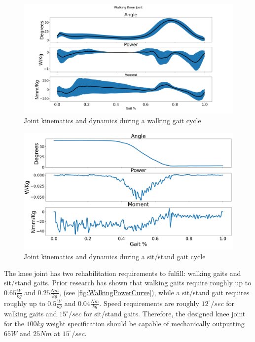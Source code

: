 \begin{figure}[ht!]
    \centering
    \includegraphics[width=\linewidth]{Figures/Design/WalkingPowerCurveKnee.png}
    \caption{Joint kinematics and dynamics during a walking gait cycle \cite{SpringWrapClutchKnee}}
    \label{fig:WalkingPowerCurve}
\end{figure}

\begin{figure}[ht!]
    \centering
    \includegraphics[width=\linewidth]{Figures/Design/SitStandPowerCurveKnee.png}
    \caption{Joint kinematics and dynamics during a sit/stand gait cycle \cite{SpringWrapClutchKnee}}
    \label{fig:SitStandPowerCurve}
\end{figure}

The knee joint has two rehabilitation requirements to fulfill: walking gaits and sit/stand gaits. Prior research has shown that walking gaits require roughly up to \(0.65 \frac{W}{kg}\) and \(0.25\frac{Nm}{kg}\), (see \autoref{fig:WalkingPowerCurve}), while a sit/stand gait requires roughly up to \(0.5 \frac{W}{kg}\) and \(0.04 \frac{Nm}{kg}\).  Speed requirements are roughly \(12^\circ/sec\) for walking gaits and \(15^\circ/sec\) for sit/stand gaits. Therefore, the designed knee joint for the \(100 kg\) weight specification should be capable of mechanically outputting \(65 W\) and \(25 Nm\) at \(15^\circ/sec\).

